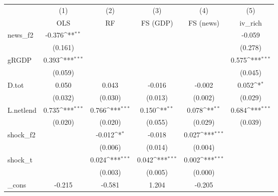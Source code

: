 {
\def\sym#1{\ifmmode^{#1}\else\(^{#1}\)\fi}
\begin{tabular}{l*{5}{c}}
\toprule
            &\multicolumn{1}{c}{(1)}&\multicolumn{1}{c}{(2)}&\multicolumn{1}{c}{(3)}&\multicolumn{1}{c}{(4)}&\multicolumn{1}{c}{(5)}\\
            &\multicolumn{1}{c}{OLS}&\multicolumn{1}{c}{RF}&\multicolumn{1}{c}{FS (GDP)}&\multicolumn{1}{c}{FS (news)}&\multicolumn{1}{c}{iv\_rich}\\
\midrule
news\_f2     &      -0.376\sym{**} &                     &                     &                     &      -0.059         \\
            &     (0.161)         &                     &                     &                     &     (0.278)         \\
\addlinespace
gRGDP       &       0.393\sym{***}&                     &                     &                     &       0.575\sym{***}\\
            &     (0.059)         &                     &                     &                     &     (0.045)         \\
\addlinespace
D.tot       &       0.050         &       0.043         &      -0.016         &      -0.002         &       0.052\sym{*}  \\
            &     (0.032)         &     (0.030)         &     (0.013)         &     (0.002)         &     (0.029)         \\
\addlinespace
L.netlend   &       0.735\sym{***}&       0.766\sym{***}&       0.150\sym{**} &       0.078\sym{**} &       0.684\sym{***}\\
            &     (0.020)         &     (0.020)         &     (0.055)         &     (0.029)         &     (0.039)         \\
\addlinespace
shock\_f2    &                     &      -0.012\sym{*}  &      -0.018         &       0.027\sym{***}&                     \\
            &                     &     (0.006)         &     (0.014)         &     (0.004)         &                     \\
\addlinespace
shock\_t     &                     &       0.024\sym{***}&       0.042\sym{***}&       0.002\sym{***}&                     \\
            &                     &     (0.003)         &     (0.005)         &     (0.000)         &                     \\
\addlinespace
\_cons      &      -0.215         &      -0.581         &       1.204         &      -0.205         &                     \\

\end{tabular}}
